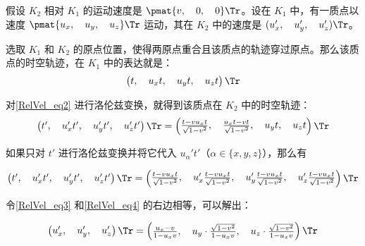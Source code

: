 假设 $K_2$ 相对 $K_1$ 的运动速度是 $\pmat{v,\quad 0,\quad 0}\Tr$。设在 $K_1$ 中，有一质点以速度 $\pmat{u_x,\quad u_y,\quad u_z}\Tr$ 运动，其在 $K_2$ 中的速度是 $(u_x',\quad u_y',\quad u_z')\Tr$。

选取 $K_1$ 和 $K_2$ 的原点位置，使得两原点重合且该质点的轨迹穿过原点。那么该质点的时空轨迹，在 $K_1$ 中的表达就是：
\begin{equation}\label{RelVel_eq2}
\left(\begin{matrix}t,\quad u_xt,\quad u_yt,\quad u_zt\end{matrix} \right)\Tr 
\end{equation}

对\autoref{RelVel_eq2} 进行洛伦兹变换，就得到该质点在 $K_2$ 中的时空轨迹：
\begin{equation}\label{RelVel_eq3}
\left(\begin{matrix}t',\quad u_x't',\quad u_y't',\quad u_z't'\end{matrix} \right)\Tr 
= 
\left(\begin{matrix}\frac{t-vu_xt}{\sqrt{1-v^2}},\quad\frac{u_xt-vt}{\sqrt{1-v^2}},\quad u_yt,\quad u_zt\end{matrix} \right)\Tr 
\end{equation}

如果只对 $t'$ 进行洛伦兹变换并将它代入 $u_\alpha't'$（$\alpha\in\{x, y, z\}$），那么有

\begin{equation}\label{RelVel_eq4}
\left(\begin{matrix}t',\quad u_x't',\quad u_y't',\quad u_z't'\end{matrix} \right)\Tr 
= 
\left(\begin{matrix}\frac{t-vu_xt}{\sqrt{1-v^2}},\quad u_x'\frac{t-vu_xt}{\sqrt{1-v^2}},\quad u_y'\frac{t-vu_xt}{\sqrt{1-v^2}},\quad u_z'\frac{t-vu_xt}{\sqrt{1-v^2}}\end{matrix} \right)\Tr 
\end{equation}

令\autoref{RelVel_eq3} 和\autoref{RelVel_eq4} 的右边相等，可以解出：

\begin{equation}
\left(\begin{matrix}u_x',\quad u_y',\quad u_z'\end{matrix} \right)\Tr 
= 
\left(\begin{matrix}\frac{u_x-v}{1-u_xv},\quad u_y\cdot\frac{\sqrt{1-v^2}}{1-u_xv},\quad u_z\cdot\frac{\sqrt{1-v^2}}{1-u_xv}\end{matrix} \right)\Tr 
\end{equation}

